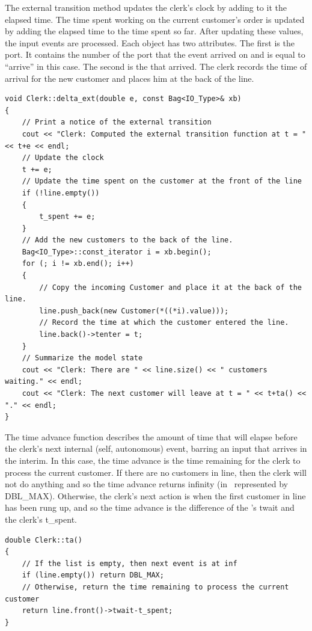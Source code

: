 The external transition method updates the clerk's clock by adding to it the elapsed time. The time spent working on the current customer's order is updated by adding the elapsed time to the time spent so far. After updating these values, the input events are processed. Each  object has two attributes. The first is the port. It contains the number of the port that the event arrived on and is equal to ``arrive'' in this case. The second is the  that arrived. The clerk records the time of arrival for the new customer and places him at the back of the line.
\begin{verbatim}
void Clerk::delta_ext(double e, const Bag<IO_Type>& xb)
{
    // Print a notice of the external transition
    cout << "Clerk: Computed the external transition function at t = " << t+e << endl;
    // Update the clock
    t += e;
    // Update the time spent on the customer at the front of the line
    if (!line.empty())
    {
        t_spent += e;
    }
    // Add the new customers to the back of the line.
    Bag<IO_Type>::const_iterator i = xb.begin();
    for (; i != xb.end(); i++)
    {
        // Copy the incoming Customer and place it at the back of the line.
        line.push_back(new Customer(*((*i).value)));
        // Record the time at which the customer entered the line.
        line.back()->tenter = t;
    }
    // Summarize the model state
    cout << "Clerk: There are " << line.size() << " customers waiting." << endl;
    cout << "Clerk: The next customer will leave at t = " << t+ta() << "." << endl;
}
\end{verbatim}

The time advance function describes the amount of time that will elapse before the clerk's next internal (self, autonomous) event, barring an input that arrives in the interim. In this case, the time advance is the time remaining for the clerk to process the current customer. If there are no customers in line, then the clerk will not do anything and so the time advance returns infinity (in \adevs\ represented by DBL\_MAX). Otherwise, the clerk's next action is when the first customer in line has been rung up, and so the time advance is the difference of the 's twait and the clerk's t\_spent.

\begin{verbatim}
double Clerk::ta()
{
    // If the list is empty, then next event is at inf
    if (line.empty()) return DBL_MAX;
    // Otherwise, return the time remaining to process the current customer
    return line.front()->twait-t_spent;
}
\end{verbatim}

